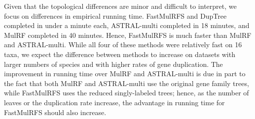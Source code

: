 Given that the topological differences are minor and difficult to interpret, we focus on differences in empirical running time.
FastMulRFS and DupTree completed in under a minute each, ASTRAL-multi completed in 18 minutes, and MulRF completed in 40 minutes.
Hence, FastMulRFS is much faster than MulRF and ASTRAL-multi.
While all four of these methods were relatively fast on 16 taxa, we expect the difference between methods to increase on datasets with larger numbers of species and with higher rates of gene duplication.
The improvement in running time over MulRF and ASTRAL-multi is due in part to the fact that both MulRF and ASTRAL-multi use the original gene family trees, while FastMulRFS uses the reduced singly-labeled trees; hence, as the number of leaves or the duplication rate increase, the advantage in running time for FastMulRFS should also increase.

